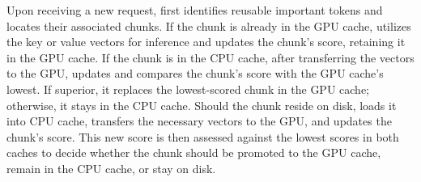 Upon receiving a new request, \pname{} first identifies reusable important tokens and locates their associated chunks. If the chunk is already in the GPU cache, \pname{} utilizes the key or value vectors for inference and updates the chunk's score, retaining it in the GPU cache. If the chunk is in the CPU cache, after transferring the vectors to the GPU, \pname{} updates and compares the chunk's score with the GPU cache's lowest. If superior, it replaces the lowest-scored chunk in the GPU cache; otherwise, it stays in the CPU cache.
Should the chunk reside on disk, \pname{} loads it into CPU cache, transfers the necessary vectors to the GPU, and updates the chunk's score. This new score is then assessed against the lowest scores in both caches to decide whether the chunk should be promoted to the GPU cache, remain in the CPU cache, or stay on disk.



%
%
